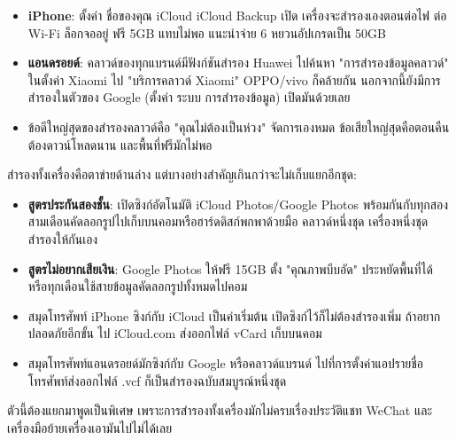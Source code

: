 
\begin{itemize}
  \item \textbf{iPhone}: ตั้งค่า ชื่อของคุณ iCloud iCloud Backup เปิด เครื่องจะสำรองเองตอนต่อไฟ ต่อ Wi-Fi ล็อกจออยู่ ฟรี 5GB แทบไม่พอ แนะนำจ่าย 6 หยวนอัปเกรดเป็น 50GB
  \item \textbf{แอนดรอยด์}: คลาวด์ของทุกแบรนด์มีฟังก์ชันสำรอง Huawei ไปค้นหา "การสำรองข้อมูลคลาวด์" ในตั้งค่า Xiaomi ไป "บริการคลาวด์ Xiaomi" OPPO/vivo ก็คล้ายกัน นอกจากนี้ยังมีการสำรองในตัวของ Google (ตั้งค่า ระบบ การสำรองข้อมูล) เปิดมันด้วยเลย
  \item ข้อดีใหญ่สุดของสำรองคลาวด์คือ "คุณไม่ต้องเป็นห่วง" จัดการเองหมด ข้อเสียใหญ่สุดคือตอนคืนต้องดาวน์โหลดนาน และพื้นที่ฟรีมักไม่พอ
\end{itemize}


สำรองทั้งเครื่องคือตาข่ายด้านล่าง แต่บางอย่างสำคัญเกินกว่าจะไม่เก็บแยกอีกชุด:


\begin{itemize}
  \item \textbf{สูตรประกันสองชั้น}: เปิดซิงก์อัตโนมัติ iCloud Photos/Google Photos พร้อมกันกับทุกสองสามเดือนคัดลอกรูปไปเก็บบนคอมหรือฮาร์ดดิสก์พกพาด้วยมือ คลาวด์หนึ่งชุด เครื่องหนึ่งชุด สำรองให้กันเอง
  \item \textbf{สูตรไม่อยากเสียเงิน}: Google Photos ให้ฟรี 15GB ตั้ง "คุณภาพบีบอัด" ประหยัดพื้นที่ได้ หรือทุกเดือนใช้สายข้อมูลคัดลอกรูปทั้งหมดไปคอม
\end{itemize}


\begin{itemize}
  \item สมุดโทรศัพท์ iPhone ซิงก์กับ iCloud เป็นค่าเริ่มต้น เปิดซิงก์ไว้ก็ไม่ต้องสำรองเพิ่ม ถ้าอยากปลอดภัยอีกขั้น ไป iCloud.com ส่งออกไฟล์ vCard เก็บบนคอม
  \item สมุดโทรศัพท์แอนดรอยด์มักซิงก์กับ Google หรือคลาวด์แบรนด์ ไปที่การตั้งค่าแอปรายชื่อโทรศัพท์ส่งออกไฟล์ .vcf ก็เป็นสำรองฉบับสมบูรณ์หนึ่งชุด
\end{itemize}


ตัวนี้ต้องแยกมาพูดเป็นพิเศษ เพราะการสำรองทั้งเครื่องมักไม่ครบเรื่องประวัติแชท WeChat และเครื่องมือย้ายเครื่องเอามันไปไม่ได้เลย

